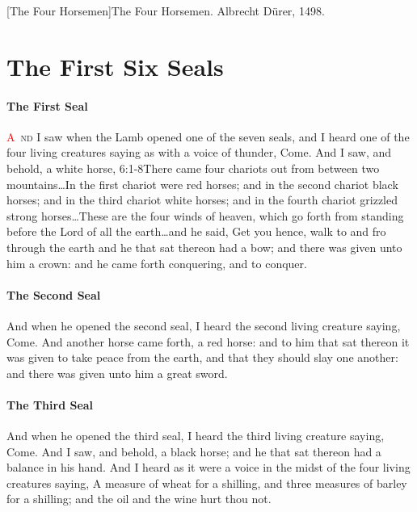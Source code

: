 [The Four Horsemen]{The Four Horsemen. Albrecht Dürer, 1498.}

\chapter{The First Six Seals}
\subsubsection*{The First Seal}
\lettrine[lines=3]{\textcolor{red}{A}}{\ nd} I saw when the Lamb opened one of the seven seals, and I heard one of the four living creatures saying as with a voice of thunder, Come. 
 And I saw, and behold, a white horse,%
					{6:1-8}{There came four chariots out from between two mountains\ldots In the first chariot were red horses; and in the second chariot black horses; and in the third chariot white horses; and in the fourth chariot grizzled strong horses\ldots These are the four winds of heaven, which go forth from standing before the Lord of all the earth\ldots and he said, Get you hence, walk to and fro through the earth}
 and he that sat thereon had a bow; and there was given unto him a crown: and he came forth conquering, and to conquer.
\subsubsection*{The Second Seal}
 And when he opened the second seal, I heard the second living creature saying, Come. %
 And another horse came forth, a red horse: and to him that sat thereon it was given to take peace from the earth, and that they should slay one another: and there was given unto him a great sword.
\subsubsection*{The Third Seal}
 And when he opened the third seal, I heard the third living creature saying, Come. And I saw, and behold, a black horse; and he that sat thereon had a balance in his hand.  And I heard as it were a voice in the midst of the four living creatures saying, A measure of wheat for a shilling, and three measures of barley for a shilling; and the oil and the wine hurt thou not.
